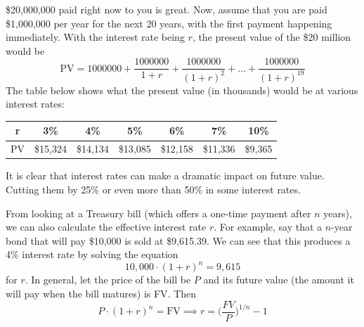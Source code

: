 \documentclass{article}
\begin{document}
    \begin{example}
      \$20,000,000 paid right now to you is great. Now, assume that you are paid \$1,000,000 per year for the next 20 years, with the first payment happening immediately. With the interest rate being $r$, the present value of the \$20 million would be
      \[\text{PV} = 1000000 + \frac{1000000}{1 + r} + \frac{1000000}{(1+r)^2} + \ldots + \frac{1000000}{(1+r)^{19}}\]
      The table below shows what the present value (in thousands) would be at various interest rates: 
      \begin{center}
      \begin{tabular}{c|c|c|c|c|c|c}
          r &  3\% & 4\% & 5\% & 6\% & 7\% & 10\%\\
          \hline
          PV & \$15,324 & \$14,134 & \$13,085 & \$12,158 & \$11,336 & \$9,365
      \end{tabular}
      \end{center}
      It is clear that interest rates can make a dramatic impact on future value. Cutting them by 25\% or even more than 50\% in some interest rates. 
    \end{example}

    From looking at a Treasury bill (which offers a one-time payment after $n$ years), we can also calculate the effective interest rate $r$. For example, say that a $n$-year bond that will pay \$10,000 is sold at \$9,615.39. We can see that this produces a 4\% interest rate by solving the equation
    \[10,000 \cdot (1 + r)^n = 9,615\]
    for $r$. In general, let the price of the bill be $P$ and its future value (the amount it will pay when the bill matures) is FV. Then
    \[P\cdot (1 + r)^n = \text{FV} \implies r = \bigg( \frac{FV}{P} \bigg)^{1/n} - 1\]
\end{document}
